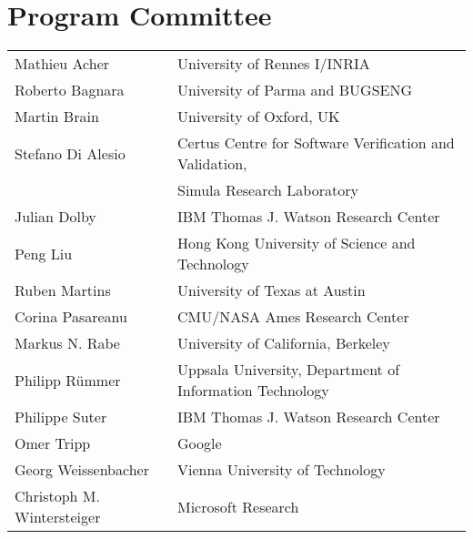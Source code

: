 \section*{Program Committee}
\noindent
\begin{longtable}{p{}p{}}
Mathieu Acher & University of Rennes I/INRIA\\
Roberto Bagnara & University of Parma and BUGSENG\\
Martin Brain & University of Oxford, UK\\
Stefano Di Alesio & Certus Centre for Software Verification and Validation,\\ 
  & Simula Research Laboratory\\
Julian Dolby & IBM Thomas J. Watson Research Center\\
Peng Liu & Hong Kong University of Science and Technology\\
Ruben Martins & University of Texas at Austin\\
Corina Pasareanu & CMU/NASA Ames Research Center\\
Markus N. Rabe & University of California, Berkeley\\
Philipp R{\"u}mmer & Uppsala University, Department of Information Technology\\
Philippe Suter & IBM Thomas J. Watson Research Center\\
Omer Tripp & Google\\
Georg Weissenbacher & Vienna University of Technology\\
Christoph M. Wintersteiger & Microsoft Research\\
\end{longtable}

\clearpage
